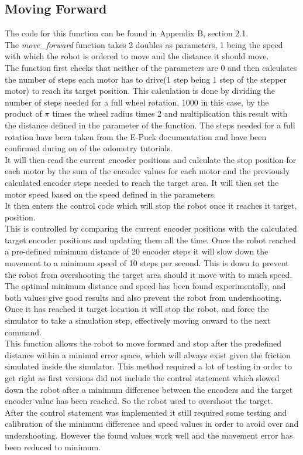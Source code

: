 \subsection{Moving Forward}
The code for this function can be found in Appendix B, section 2.1.\\
The \textit{move\_forward }function takes 2 doubles as parameters, 1 being the speed with which the robot is ordered to move and the distance it should move.\\
The function first checks that neither of the parameters are 0 and then calculates the number of steps each motor has to drive(1 step being 1 step of the stepper motor) to reach its target position.
This calculation is done by dividing the number of steps needed for a full wheel rotation, 1000 in this case, by the product of $\pi$ times the wheel radius times 2 and multiplication this result with the distance defined in the parameter of the function. The steps needed for a full rotation have been taken from the E-Puck documentation and have been confirmed during on of the odometry tutorials. \\
It will then read the current encoder positions and calculate the stop position for each motor by the sum of the encoder values for each motor and the previously calculated encoder steps needed to reach the target area. 
It will then set the motor speed based on the speed defined in the parameters.\\[3ex]

It then enters the control code which will stop the robot once it reaches it target, position. \\
This is controlled by comparing the current encoder positions with the calculated target encoder positions and updating them all the time. 
Once the robot reached a pre-defined minimum distance of 20 encoder steps it will slow down the movement to a minimum speed of 10 steps per second. This is down to prevent the robot from overshooting the target area should it move with to much speed. The optimal minimum distance and speed has been found experimentally, and both values give good results and also prevent the robot from undershooting.
Once it has reached it target location it will stop the robot, and force the simulator to take a simulation step, effectively moving onward to the next command.\\[3ex]

This function allows the robot to move forward and stop after the predefined distance within a minimal error space, which will always exist given the friction simulated inside the simulator. This method required a lot of testing in order to get right as first versions did not include the control statement which slowed down the robot after a minimum difference between the encoders and the target encoder value has been reached. So the robot used to overshoot the target. \\
After the control statement was implemented it still required some testing and calibration of the minimum difference and speed values in order to avoid over and undershooting. However the found values work well and the movement error has been reduced to minimum.\\

